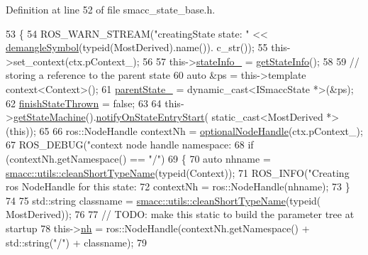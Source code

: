 Definition at line 52 of file smacc\+\_\+state\+\_\+base.\+h.


\begin{DoxyCode}
53   \{
54     ROS\_WARN\_STREAM(\textcolor{stringliteral}{"creatingState state: "} << \hyperlink{namespacesmacc_1_1introspection_a2f495108db3e57604d8d3ff5ef030302}{demangleSymbol}(\textcolor{keyword}{typeid}(MostDerived).name()).
      c\_str());
55     this->set\_context(ctx.pContext\_);
56 
57     this->\hyperlink{classsmacc_1_1ISmaccState_af20df2cfd3aa826fe02a3d703dc63c1b}{stateInfo\_} = \hyperlink{classsmacc_1_1SmaccState_ab7825f5db39dcbee4e4384913026d3e2}{getStateInfo}();
58 
59     \textcolor{comment}{// storing a reference to the parent state}
60     \textcolor{keyword}{auto} &ps = this->\textcolor{keyword}{template} context<Context>();
61     \hyperlink{classsmacc_1_1ISmaccState_ad61db41d8d06a836e7d1dac7767f5695}{parentState\_} = \textcolor{keyword}{dynamic\_cast<}ISmaccState *\textcolor{keyword}{>}(&ps);
62     \hyperlink{classsmacc_1_1SmaccState_a6c40f733c35ddfb9ae2a2f8e9bab07d3}{finishStateThrown} = \textcolor{keyword}{false};
63 
64     this->\hyperlink{classsmacc_1_1SmaccState_afc39f8e0ca4001b2159a100da2fccd0e}{getStateMachine}().\hyperlink{classsmacc_1_1ISmaccStateMachine_aeec54e997d715b105ebfeb5caadc4fbf}{notifyOnStateEntryStart}(
      static\_cast<MostDerived *>(\textcolor{keyword}{this}));
65 
66     ros::NodeHandle contextNh = \hyperlink{namespacesmacc_1_1introspection_a8acc3b4146a8b2bb0a9fa4178840e9b9}{optionalNodeHandle}(ctx.pContext\_);
67     ROS\_DEBUG(\textcolor{stringliteral}{"context node handle namespace: %
68     \textcolor{keywordflow}{if} (contextNh.getNamespace() == \textcolor{stringliteral}{"/"})
69     \{
70       \textcolor{keyword}{auto} nhname = \hyperlink{namespacesmacc_1_1utils_aacd1975bb7cd9bec4b50e111a2ae7edb}{smacc::utils::cleanShortTypeName}(\textcolor{keyword}{typeid}(Context));
71       ROS\_INFO(\textcolor{stringliteral}{"Creating ros NodeHandle for this state: %
72       contextNh = ros::NodeHandle(nhname);
73     \}
74 
75     std::string classname = \hyperlink{namespacesmacc_1_1utils_aacd1975bb7cd9bec4b50e111a2ae7edb}{smacc::utils::cleanShortTypeName}(\textcolor{keyword}{typeid}(
      MostDerived));
76 
77     \textcolor{comment}{// TODO: make this static to build the parameter tree at startup}
78     this->\hyperlink{classsmacc_1_1ISmaccState_a13fe6e6abfdb87996402189d44b78494}{nh} = ros::NodeHandle(contextNh.getNamespace() + std::string(\textcolor{stringliteral}{"/"}) + classname);
79 
}}
\end{DoxyCode}
